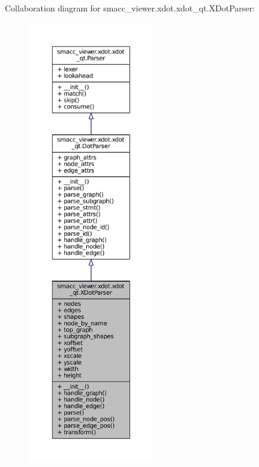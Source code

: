 Collaboration diagram for smacc\+\_\+viewer.\+xdot.\+xdot\+\_\+qt.\+X\+Dot\+Parser\+:
\nopagebreak
\begin{figure}[H]
\begin{center}
\leavevmode
\includegraphics[height=550pt]{classsmacc__viewer_1_1xdot_1_1xdot__qt_1_1XDotParser__coll__graph}
\end{center}
\end{figure}
